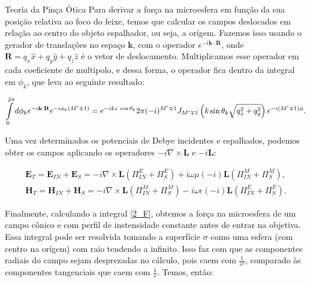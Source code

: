 \begin{chapter}{Teoria da Pinça Ótica}
Para derivar a força na microesfera em função da sua posição relativa ao foco do feixe, temos que calcular os campos deslocados em relação ao centro do objeto espalhador, ou seja, a orígem. Fazemos isso usando o gerador de translações no espaço ${\mathbf k}$, com o operador $e^{-i{\mathbf k}\cdot{\mathbf R}}$, onde ${\mathbf R}=q_x\hat{x}+q_y\hat{y}+q_z\hat{z}$ é o vetor de deslocamento. Multiplicamos esse operador em cada coeficiente de multipolo, e dessa forma, o operador fica dentro da integral em $\phi_k$, que leva ao seguinte resultado:

\begin{equation}
\begin{split}
\int\limits_0^{2\pi} d\phi_k e^{-i{\mathbf k}\cdot{\mathbf R}} e^{-i\phi_k(M'\mp1)}=e^{-ik z\thinspace \cos\theta_k} 2\pi(-i)^{M'\mp1}J_{M'\mp1}\left(k\sin\theta_k\sqrt{q_x^2+q_y^2}\right)e^{-i(M'\mp1)\phi}.
\end{split}
\end{equation}
%

Uma vez determinados os potenciais de Debye incidentes e espalhados, podemos obter os campos aplicando os operadores $-i\nabla\times{\mathbf L}$ e $-i{\mathbf L}$:

\begin{equation}
\begin{split}
{\mathbf E}_T={\mathbf E}_{IN}+{\mathbf E}_{S}=-i\nabla\times{\mathbf L}(\Pi^E_{IN}+\Pi^E_S)+i \omega \mu(-i){\mathbf L}(\Pi^M_{IN}+\Pi^M_S), \\
{\mathbf H}_T={\mathbf H}_{IN}+{\mathbf H}_{S}=-i\nabla\times{\mathbf L}(\Pi^M_{IN}+\Pi^M_S)-i \omega \epsilon(-i){\mathbf L}(\Pi^E_{IN}+\Pi^E_S).
\end{split}
\end{equation}
%

Finalmente, calculando a integral \ref{2_F}, obtemos a força na microesfera de um campo cônico e com perfil de instensidade constante antes de entrar na objetiva. Essa integral pode ser resolvida tomando a superfície $\sigma$ como uma esfera (com centro na orígem) com raio tendendo a infinito. Isso faz com que as componentes radiais do campo sejam desprezadas no cálculo, pois caem com $\frac{1}{r^2}$, comparado às componentes tangenciais que caem com $\frac{1}{r}$. Temos, então:


\end{chapter}
